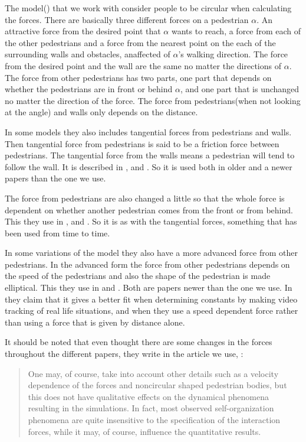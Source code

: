 The model(\cite{self-org}) that we work with consider people to be circular when calculating the forces.
There are basically three different forces on a pedestrian $\alpha$. An attractive force from the
desired point that $\alpha$ wants to reach, a force from each of the other pedestrians and
a force from the nearest point on the each of the surrounding walls and obstacles, anaffected of
$\alpha$'s walking direction.
The force from the desired point and the wall are the same no matter the directions of $\alpha$.
The force from other pedestrians has two parts, one part that depends on whether the pedestrians are
in front or behind $\alpha$, and one part that is unchanged no matter the direction of the force.
The force from pedestrians(when not looking at the angle) and walls only depends on the distance. 

In some models they also includes tangential forces from pedestrians and walls. Then tangential force
from pedestrians is said to be a friction force between pedestrians. The tangential force from the walls
means a pedestrian will tend to follow the wall. It is described in \cite{helbing00},  and \cite{HelbingNew}.
So it is used both in older and a newer papers than the one we use.

The force from pedestrians are also changed a little so that the whole force is dependent
on whether another pedestrian comes from the front or from behind. This they use in \cite{ABconstant},
\cite{HelbingNew} and  \cite{helbing00}. So it is as with the tangential forces, something that has been used from time to time. 

In some variations of the model they also have a more advanced force from other pedestrians.
In the advanced form the force from other pedestrians depends on the speed of the pedestrians
and also the shape of the pedestrian is made elliptical. This they use in \cite{HelbingNew} and \cite{ABconstant}.
Both are papers newer than the one we use. In \cite{ABconstant} they claim that it gives a better fit when
determining constants by making video tracking of real life situations, and when they use a speed dependent
force rather than using a force that is given by distance alone. 

It should be noted that even thought there are some changes in the forces throughout the different papers,
they write in the article we use, \cite{self-org}:
\begin{quote}
 One may, of
course, take into account other details such as a velocity
dependence of the forces and noncircular shaped
pedestrian bodies, but this does not have qualitative
effects on the dynamical phenomena resulting in the
simulations. In fact, most observed self-organization
phenomena are quite insensitive to the specification
of the interaction forces, while it may, of course, influence
the quantitative results.
\end{quote}

